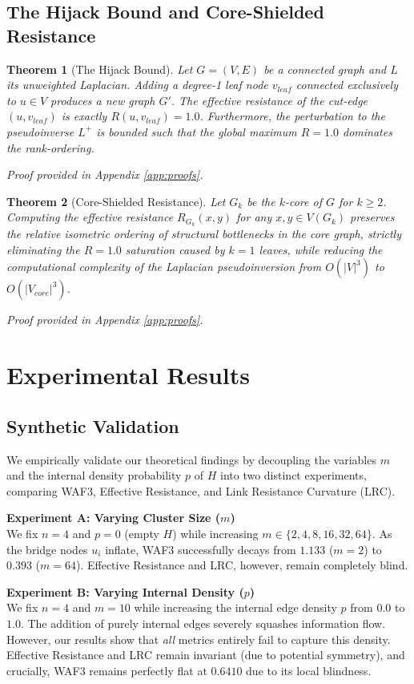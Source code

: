 \documentclass[10pt]{article} %
\newtheorem{theorem}{Theorem}
\begin{document}
\subsection{The Hijack Bound and Core-Shielded Resistance}
\begin{theorem}[The Hijack Bound]
Let $G = (V, E)$ be a connected graph and $L$ its unweighted Laplacian. Adding a degree-1 leaf node $v_{leaf}$ connected exclusively to $u \in V$ produces a new graph $G'$. The effective resistance of the cut-edge $(u, v_{leaf})$ is exactly $R(u, v_{leaf}) = 1.0$. Furthermore, the perturbation to the pseudoinverse $L^+$ is bounded such that the global maximum $R=1.0$ dominates the rank-ordering.
\end{theorem}
\textit{Proof provided in Appendix \ref{app:proofs}.}

\begin{theorem}[Core-Shielded Resistance]
Let $G_k$ be the $k$-core of $G$ for $k \ge 2$. Computing the effective resistance $R_{G_k}(x,y)$ for any $x,y \in V(G_k)$ preserves the relative isometric ordering of structural bottlenecks in the core graph, strictly eliminating the $R=1.0$ saturation caused by $k=1$ leaves, while reducing the computational complexity of the Laplacian pseudoinversion from $O(|V|^3)$ to $O(|V_{core}|^3)$.
\end{theorem}
\textit{Proof provided in Appendix \ref{app:proofs}.}

\section{Experimental Results}
\subsection{Synthetic Validation}
We empirically validate our theoretical findings by decoupling the variables $m$ and the internal density probability $p$ of $H$ into two distinct experiments, comparing WAF3, Effective Resistance, and Link Resistance Curvature (LRC).

\textbf{Experiment A: Varying Cluster Size ($m$)} \\
We fix $n=4$ and $p=0$ (empty $H$) while increasing $m \in \{2, 4, 8, 16, 32, 64\}$. As the bridge nodes $u_i$ inflate, WAF3 successfully decays from $1.133$ ($m=2$) to $0.393$ ($m=64$). Effective Resistance and LRC, however, remain completely blind.

\textbf{Experiment B: Varying Internal Density ($p$)} \\
We fix $n=4$ and $m=10$ while increasing the internal edge density $p$ from $0.0$ to $1.0$. The addition of purely internal edges severely squashes information flow. However, our results show that \textit{all} metrics entirely fail to capture this density. Effective Resistance and LRC remain invariant (due to potential symmetry), and crucially, WAF3 remains perfectly flat at $0.6410$ due to its local blindness.
\end{document}

